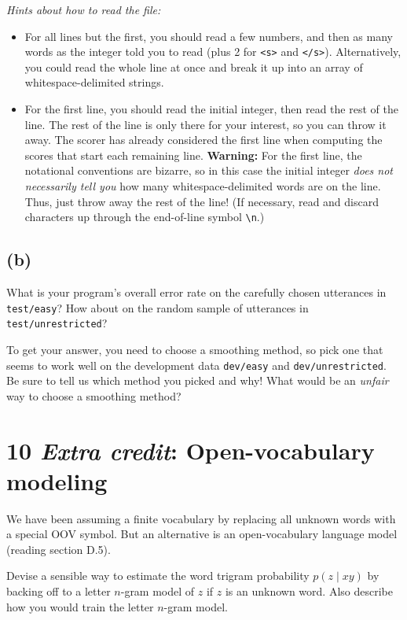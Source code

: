 \documentclass[12pt]{article}
\theoremstyle{plain}
\theoremstyle{definition}
\theoremstyle{remark}
\begin{document}
\textit{Hints about how to read the file:}
\begin{itemize}
    \item For all lines but the first, you should read a few numbers, and then as many words as the integer told you to read (plus 2 for \texttt{<s>} and \texttt{</s>}). Alternatively, you could read the whole line at once and break it up into an array of whitespace-delimited strings.
    \item For the first line, you should read the initial integer, then read the rest of the line. The rest of the line is only there for your interest, so you can throw it away. The scorer has already considered the first line when computing the scores that start each remaining line. \textbf{Warning:} For the first line, the notational conventions are bizarre, so in this case the initial integer \textit{does not necessarily tell you} how many whitespace-delimited words are on the line. Thus, just throw away the rest of the line! (If necessary, read and discard characters up through the end-of-line symbol \texttt{\textbackslash n}.)
\end{itemize}

\subsection*{(b)}
What is your program’s overall error rate on the carefully chosen utterances in \texttt{test/easy}? How about on the random sample of utterances in \texttt{test/unrestricted}?

To get your answer, you need to choose a smoothing method, so pick one that seems to work well on the development data \texttt{dev/easy} and \texttt{dev/unrestricted}. Be sure to tell us which method you picked and why! What would be an \textit{unfair} way to choose a smoothing method?


\section*{10 \textit{Extra credit}: Open-vocabulary modeling}

We have been assuming a finite vocabulary by replacing all unknown words with a special OOV symbol. But an alternative is an open-vocabulary language model (reading section D.5).

Devise a sensible way to estimate the word trigram probability $p(z \mid xy)$ by backing off to a letter $n$-gram model of $z$ if $z$ is an unknown word. Also describe how you would train the letter $n$-gram model.
\end{document}

